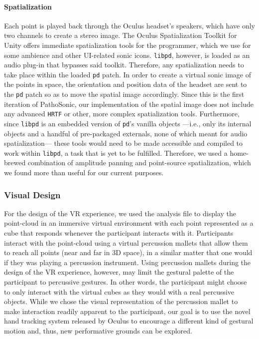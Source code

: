 \documentclass{nime-alternate}
\begin{document}
\paragraph{Spatialization}

Each point is played back through the Oculus headset's speakers, which have only two channels to create a stereo image. The Oculus Spatialization Toolkit for Unity offers immediate spatialization tools for the programmer, which we use for some ambience and other UI-related sonic icons. \texttt{libpd}, however, is loaded as an audio plug-in that bypasses said toolkit. Therefore, any spatialization needs to take place within the loaded \texttt{pd} patch. In order to create a virtual sonic image of the points in space, the orientation and position data of the headset are sent to the \texttt{pd} patch so as to move the spatial image accordingly. Since this is the first iteration of PathoSonic, our implementation of the spatial image does not include any advanced \texttt{HRTF} or other, more complex spatialization tools. Furthermore, since \texttt{libpd} is an embedded version of \texttt{pd}'s vanilla objects ---i.e., only its internal objects and a handful of pre-packaged externals, none of which meant for audio spatialization--- these tools would need to be made accessible and compiled to work within \texttt{libpd}, a task that is yet to be fulfilled. Therefore, we used a home-brewed combination of amplitude panning and point-source spatialization, which we found more than useful for our current purposes.


\subsubsection{Visual Design}

For the design of the VR experience, we used the analysis file to display the point-cloud in an immersive virtual environment with each point represented as a cube that responds whenever the participant interacts with it. Participants interact with the point-cloud using a virtual percussion mallets that allow them to reach all points (near and far in 3D space), in a similar matter that one would if they was playing a percussion instrument. Using percussion mallets during the design of the VR experience, however, may limit the gestural palette of the participant to percussive gestures. In other words, the participant might choose to only interact with the virtual cubes as they would with a real percussive objects. While we chose the visual representation of the percussion mallet to make interaction readily apparent to the participant, our goal is to use the novel hand tracking system released by Oculus to encourage a different kind of gestural motion and, thus, new performative grounds can be explored. 
\end{document}

